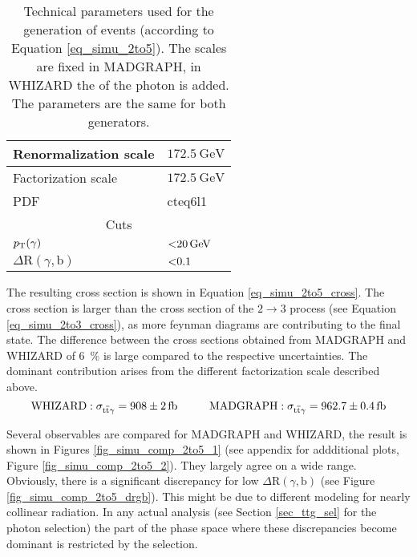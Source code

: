 \begin{table}[ht]
\centering
    \caption{Technical parameters used for the generation of \ttgamma events (according to\\ Equation \ref{eq_simu_2to5}). The scales are fixed in MADGRAPH, in WHIZARD the \pt of the photon is added. The parameters are the same for both generators.}
    \begin{tabular}{| l | l |}

    \hline
    Renormalization scale & $ \SI{172.5}{\giga \electronvolt} $ \\
    \hline
    Factorization scale & $ \SI{172.5}{\giga \electronvolt} $ \\
    \hline
    PDF & cteq6l1 \\
    \hline
    \multicolumn{2}{|c|}{Cuts} \\
    \hline
    $p_{\mathrm{T}}(\gamma)$ & $\SI{<20}{\giga \electronvolt}$ \\
    \hline
    $\Delta \mathrm{R}(\gamma,\mathrm{b})$ & $\num{<0.1}$ \\
    \hline
    \end{tabular}
     \label{tab_simu_2to5}
\end{table}

The resulting cross section is shown in Equation \ref{eq_simu_2to5_cross}. The cross section is larger than the cross section of the $2 \to 3$ process (see Equation \ref{eq_simu_2to3_cross}), as more feynman diagrams are contributing to the final state. The difference between the cross sections obtained from MADGRAPH and WHIZARD of \SI{6}{\percent} is large compared to the respective uncertainties. The dominant contribution arises from the different factorization scale described above.\\

\begin{equation}
\mathrm{WHIZARD: }\; \sigma_{\ttgamma} = \SI{908 \pm 2}{\femto \barn} \hspace{1.cm} \mathrm{MADGRAPH: }\; \sigma_{\ttgamma} = \SI{962.7 \pm 0.4}{\femto \barn}
\label{eq_simu_2to5_cross}
\end{equation}

Several observables are compared for MADGRAPH and WHIZARD, the result is shown in Figures \ref{fig_simu_comp_2to5_1} (see appendix for addditional plots, Figure \ref{fig_simu_comp_2to5_2}). They largely agree on a wide range. Obviously, there is a significant discrepancy for low $\Delta \mathrm{R} (\gamma,\mathrm{b})$ (see Figure \ref{fig_simu_comp_2to5_drgb}). This might be due to different modeling for nearly collinear radiation. In any actual analysis (see Section \ref{sec_ttg_sel} for the photon selection) the part of the phase space where these discrepancies become dominant is restricted by the selection.

